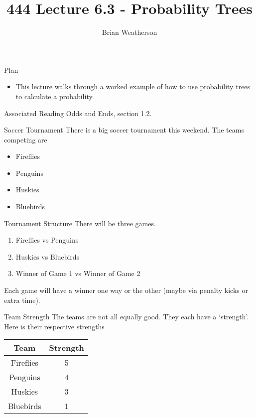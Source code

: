 \documentclass[
  ignorenonframetext,
]{beamer}
\title{444 Lecture 6.3 - Probability Trees}
\author{Brian Weatherson}
\date{}
\providecommand{\tightlist}{%
  \setlength{\itemsep}{0pt}\setlength{\parskip}{0pt}}
\begin{document}
\frame{\titlepage}

\begin{frame}{Plan}
\protect\hypertarget{plan}{}
\begin{itemize}
\tightlist
\item
  This lecture walks through a worked example of how to use probability
  trees to calculate a probability.
\end{itemize}
\end{frame}

\begin{frame}{Associated Reading}
\protect\hypertarget{associated-reading}{}
Odds and Ends, section 1.2.
\end{frame}

\begin{frame}{Soccer Tournament}
\protect\hypertarget{soccer-tournament}{}
There is a big soccer tournament this weekend. The teams competing are

\begin{itemize}
\tightlist
\item
  Fireflies
\item
  Penguins
\item
  Huskies
\item
  Bluebirds
\end{itemize}
\end{frame}

\begin{frame}{Tournament Structure}
\protect\hypertarget{tournament-structure}{}
There will be three games.

\begin{enumerate}
\tightlist
\item
  Fireflies vs Penguins
\item
  Huskies vs Bluebirds
\item
  Winner of Game 1 vs Winner of Game 2
\end{enumerate}

Each game will have a winner one way or the other (maybe via penalty
kicks or extra time).
\end{frame}

\begin{frame}{Team Strength}
\protect\hypertarget{team-strength}{}
The teams are not all equally good. They each have a `strength'. Here is
their respective strengths

\begin{longtable}[]{@{}cc@{}}
\toprule
Team & Strength \\
\midrule
\endhead
Fireflies & 5 \\
Penguins & 4 \\
Huskies & 3 \\
Bluebirds & 1 \\
\bottomrule
\end{longtable}
\end{frame}
\end{document}
